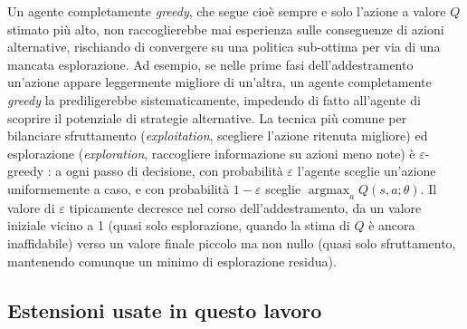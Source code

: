 Un agente completamente \emph{greedy}, che segue cioè sempre e solo l'azione a valore $Q$ stimato più
alto, non raccoglierebbe mai esperienza sulle conseguenze di azioni
alternative, rischiando di convergere su una politica sub-ottima per via
di una mancata esplorazione. Ad esempio, se nelle prime fasi
dell'addestramento un'azione appare leggermente migliore di un'altra, un
agente completamente \emph{greedy} la prediligerebbe sistematicamente,
impedendo di fatto all'agente di scoprire il potenziale di strategie alternative.
La tecnica più comune per bilanciare sfruttamento (\emph{exploitation}, scegliere
l'azione ritenuta migliore) ed esplorazione (\emph{exploration},
raccogliere informazione su azioni meno note) è $\varepsilon$-greedy
\citep{suttonbarto2018}: a
ogni passo di decisione, con probabilità $\varepsilon$ l'agente sceglie
un'azione uniformemente a caso, e con probabilità $1-\varepsilon$ sceglie
$\operatorname*{argmax}_a Q(s,a;\theta)$. Il valore di $\varepsilon$
tipicamente decresce nel corso dell'addestramento, da un valore iniziale
vicino a 1 (quasi solo esplorazione, quando la stima di $Q$ è ancora
inaffidabile) verso un valore finale piccolo ma non nullo (quasi solo
sfruttamento, mantenendo comunque un minimo di esplorazione residua).

\subsection{Estensioni usate in questo lavoro}

